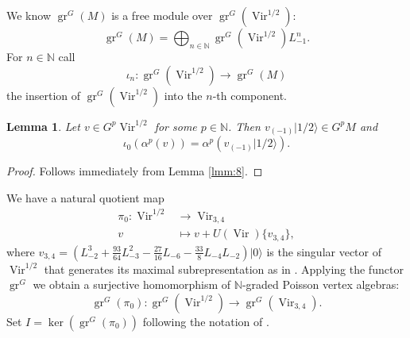\documentclass[12pt,a4paper]{article}
\newtheorem{lemma}{Lemma}
\DeclareMathOperator{\Vir}{Vir}
\DeclareMathOperator{\gr}{gr}
\newcommand{\vac}{|0\rangle}
\newcommand{\vachalf}{|1/2\rangle}
\begin{document}
We know $\gr^G(M)$ is a free module over $\gr^G(\Vir^{1/2})$:
\begin{equation*}
  \gr^G(M)=\bigoplus_{n\in \mathbb{N}}\gr^G(\Vir^{1/2})L_{-1}^n.
\end{equation*}
For $n\in \mathbb{N}$ call
\begin{equation*}
  \iota_n:\gr^G(\Vir^{1/2})\to\gr^G(M)
\end{equation*}
the insertion of $\gr^G(\Vir^{1/2})$ into the $n$-th component.
\begin{lemma}
  \label{lmm:9}
  Let $v\in G^p\Vir^{1/2}$ for some $p\in \mathbb{N}$.
  Then $v_{(-1)}\vachalf\in G^pM$ and
  \begin{equation*}
    \iota_0(\alpha^p(v))=\alpha^p(v_{(-1)}\vachalf).
  \end{equation*}
\end{lemma}

\begin{proof}
  Follows immediately from Lemma \ref{lmm:8}.
\end{proof}

We have a natural quotient map
\begin{align*}
  \pi_0:\Vir^{1/2}&\to\Vir_{3,4} \\
 v&\mapsto v+U(\Vir)\{v_{3,4}\},
\end{align*}
where $v_{3,4}=(L_{-2}^3+\frac{93}{64}L_{-3}^2-\frac{27}{16}L_{-6}-\frac{33}{8}L_{-4}L_{-2})\vac$ is the singular vector of $\Vir^{1/2}$ that generates its maximal subrepresentation as in \cite{andrews_singular_2022}.
Applying the functor $\gr^G$ we obtain a surjective homomorphism of $\mathbb{N}$-graded Poisson vertex algebras:
\begin{equation*}
  \gr^G(\pi_0):\gr^G(\Vir^{1/2})\to \gr^G(\Vir_{3,4}).
\end{equation*}
Set $I=\ker(\gr^G(\pi_0))$ following the notation of \cite{andrews_singular_2022}.
  
\end{document}
